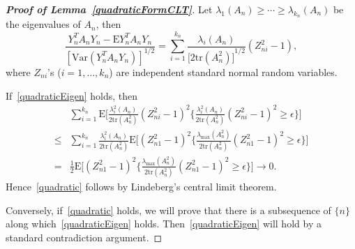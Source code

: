 \documentclass[review]{elsarticle}
\theoremstyle{plain}
\theoremstyle{definition}
\theoremstyle{remark}
\begin{document}
\begin{proof}[\textbf{Proof of Lemma~\ref{quadraticFormCLT}}]
    Let $\lambda_1(A_n)\geq\cdots\geq \lambda_{k_n}(A_n)$ be the eigenvalues of $A_n$, then 
    \begin{equation}
        \frac{Y_n^T A_n Y_n-\mathrm{E} Y_n^T A_n Y_n}{{[\mathrm{Var}(Y_n^T A_n Y_n)]}^{1/2}}=\sum_{i=1}^{k_n}\frac{\lambda_i(A_n)}{{\big[2\mathrm{tr}(A_n^2)\big]}^{1/2}}(Z_{ni}^2-1),
    \end{equation}
    where $Z_{ni}$'s ($i=1,\ldots,k_n$) are independent standard normal random variables.

    If~\ref{quadraticEigen} holds, then
    \begin{equation*}
        \begin{aligned}
            &\sum_{i=1}^{k_n}\mathrm{E}\Big[\frac{\lambda_i^2(A_n)}{2\mathrm{tr}(A_n^2)}{(Z_{ni}^2-1)}^2\Big\{\frac{\lambda_i^2(A_n)}{2\mathrm{tr}(A_n^2)}{(Z_{ni}^2-1)}^2\geq \epsilon\Big\}\Big]\\
            \leq&\sum_{i=1}^{k_n}
            \frac{\lambda_i^2(A_n)}{2\mathrm{tr}(A_n^2)}
            \mathrm{E}\Big[{(Z_{n1}^2-1)}^2\Big\{\frac{\lambda_{\max}(A_n^2)}{2\mathrm{tr}(A_n^2)}{(Z_{n1}^2-1)}^2\geq \epsilon\Big\}\Big]\\
            =&
            \frac{1}{2}\mathrm{E}\Big[{(Z_{n1}^2-1)}^2\Big\{\frac{\lambda_{\max}(A_n^2)}{2\mathrm{tr}(A_n^2)}{(Z_{n1}^2-1)}^2\geq \epsilon\Big\}\Big]\to 0.
        \end{aligned}
    \end{equation*}
    Hence~\ref{quadratic} follows by Lindeberg's central limit theorem.

    Conversely, if~\ref{quadratic} holds, we will prove that there is a subsequence of $\{n\}$ along which~\ref{quadraticEigen} holds. Then~\ref{quadraticEigen} will hold by a standard contradiction argument. 


\end{proof}
\end{document}
